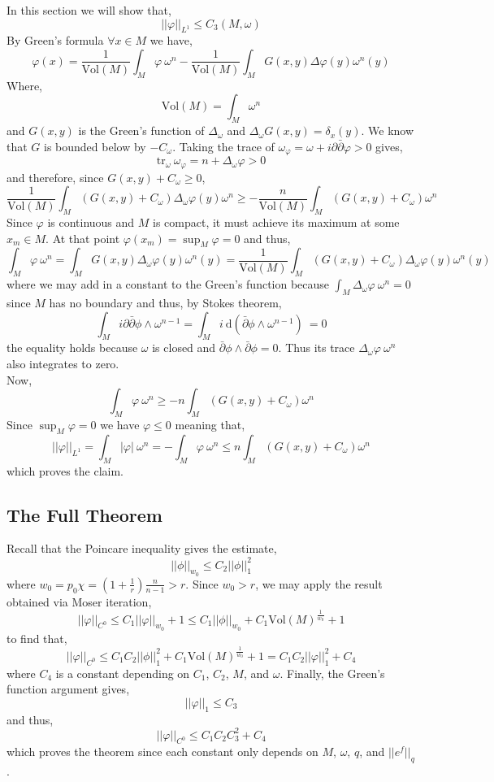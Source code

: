 \documentclass[12pt]{extarticle}
\renewcommand{\d}[1]{\: \mathrm{d}#1 \:}
\theoremstyle{definition}
\newcommand{\Vol}[1]{\mathrm{Vol}\left(#1\right)}
\newcommand{\tr}[1]{\mathrm{tr}_{#1} \:}
\begin{document}
In this section we will show that,
\[ || \varphi ||_{L^1} \le C_3(M, \omega) \]
By Green's formula $\forall x \in M$ we have,
\[ \varphi(x) = \frac{1}{\Vol{M}} \int_M \varphi \: \omega^n - \frac{1}{\Vol{M}} \int_M G(x, y) \Delta \varphi(y) \omega^n(y) \]
Where,
\[ \Vol{M} = \int_M \omega^n \]
and $G(x,y)$ is the Green's function of $\Delta_\omega$ and $\Delta_\omega G(x, y) = \delta_x(y)$. We know that $G$ is bounded below by $- C_\omega$. Taking the trace of $\omega_\varphi = \omega + i \partial \bar{\partial} \varphi > 0$ gives, 
\[ \tr{\omega}{\omega_\varphi} = n + \Delta_\omega \varphi > 0 \]
and therefore, since $G(x,y) + C_\omega \ge 0$, 
\[ \frac{1}{\Vol{M}} \int_M \left( G(x, y) + C_\omega \right)  \Delta_\omega \varphi(y)\omega^n \ge -\frac{n}{\Vol{M}} \int_M \left( G(x, y) + C_\omega \right) \omega^n \]
Since $\varphi$ is continuous and $M$ is compact, it must achieve its maximum at some $x_m \in M$. At that point $\varphi(x_m) = \sup_M \varphi = 0$ and thus,
\[ \int_M \varphi \: \omega^n = \int_M G(x, y) \Delta_\omega \varphi(y) \omega^n(y) = \frac{1}{\Vol{M}} \int_M (G(x, y) + C_\omega) \Delta_\omega \varphi(y) \omega^n(y)  \]
where we may add in a constant to the Green's function because $\int_M \Delta_\omega \varphi \: \omega^n = 0$ since $M$ has no boundary and thus, by Stokes theorem,
\[ \int_M i \partial \bar{\partial} \phi \wedge \omega^{n-1} = \int_M i \d{\left( \bar{\partial} \phi \wedge \omega^{n-1} \right)} = 0 \]
the equality holds because $\omega$ is closed and $\bar{\partial} \phi \wedge \bar{\partial} \phi = 0$. Thus its trace $\Delta_\omega \varphi \: \omega^n$ also integrates to zero.
\bigskip\\
Now,
\[  \int_M \varphi \: \omega^n \ge -n \int_M \left( G(x, y) + C_\omega \right) \omega^n  \]
Since $\sup_M \varphi = 0$ we have $\varphi \le 0$ meaning that,
\[ || \varphi ||_{L^1} = \int_M | \varphi | \: \omega^n = - \int_ M \varphi \: \omega^n \le n \int_M \left( G(x, y) + C_\omega \right) \omega^n \]
which proves the claim.

\subsection{The Full Theorem}

Recall that the Poincare inequality gives the estimate,
\[ || \phi ||_{w_0} \le C_2 || \phi ||_1^2 \]
where $w_0 = p_0 \chi = (1 + \frac{1}{r}) \frac{n}{n-1} > r$. Since $w_0 > r$, we may apply the result obtained via Moser iteration,
\[ || \varphi ||_{C^0} \le C_1 || \varphi ||_{w_0} + 1 \le C_1 || \phi ||_{w_0} + C_1 \Vol{M}^{\frac{1}{w_0}} + 1 \]
to find that,
\[ || \varphi ||_{C^0} \le C_1 C_2 || \phi ||_1^2 + C_1 \Vol{M}^{\frac{1}{w_0}} + 1 =  C_1 C_2 || \varphi ||_1^2 + C_4 \]
where $C_4$ is a constant depending on $C_1$, $C_2$, $M$, and $\omega$.
Finally, the Green's function argument gives,
\[ || \varphi ||_1 \le C_3 \]
and thus,
\[ || \varphi ||_{C^0} \le C_1 C_2 C_3^2 + C_4 \]
which proves the theorem since each constant only depends on $M$, $\omega$, $q$, and $|| e^f ||_q$. 
\end{document}
